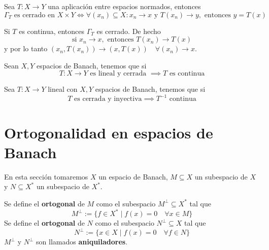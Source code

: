 \documentclass[12pt]{book}
\newcommand{\tbf}{\textbf}
\begin{document}
\begin{prop}
    Sea $T: X \to Y$ una aplicación entre espacios normados, entonces
    \begin{equation*}
        \Gamma_T \text{ es cerrado en } X \times Y \iff \forall (x_n) \subseteq X : x_n \to x \text{ y } T(x_n) \to y, \text{ entonces } y = T(x)
    \end{equation*}
\end{prop}

\begin{observacion}
    Si $T$ es continua, entonces $\Gamma_T$ es cerrado. De hecho
    \begin{equation*}
        \text{si } x_n \to x, \text{ entonces } T(x_n) \to T(x)
    \end{equation*}
    y por lo tanto $(x_n, T(x_n)) \to (x, T(x)) \quad \forall (x_n) \to x$. \\
\end{observacion}


\begin{teo}
    Sean $X, Y$ espacios de Banach, tenemos que si
    \begin{equation*}
        T: X \to Y \text{ es lineal y cerrada } \implies T \text{ es continua}
    \end{equation*}
\end{teo}

\begin{coro}
    Sea $T: X \to Y$ lineal con $X, Y$ espacios de Banach, tenemos que si 
    \begin{equation*}
        T \text{ es cerrada y inyectiva} \implies T^{-1} \text{ continua}
    \end{equation*}
\end{coro}

\section{Ortogonalidad en espacios de Banach}

\noindent
En esta sección tomaremos $X$ un espacio de Banach, $M\subseteq X$ un subespacio de $X$ y $N\subseteq X^*$ un subespacio de $X^*$.

\begin{definicion}
    Se define el \tbf{ortogonal} de $M$ como el subespacio $M^{\perp} \subseteq X^*$ tal que
    \begin{equation*}
        M^{\perp} := \{ f \in X^* \mid f(x) = 0 \quad \forall x \in M \}
    \end{equation*}
    Se define el \tbf{ortogonal} de $N$ como el subespacio $N^{\perp} \subseteq X$ tal que
    \begin{equation*}        
        N^{\perp} := \{ x \in X \mid f(x) = 0 \quad \forall f \in N \}
    \end{equation*}
    $M^{\perp}$ y $N^{\perp}$ son llamados \tbf{aniquiladores}.
\end{definicion}
\end{document}
